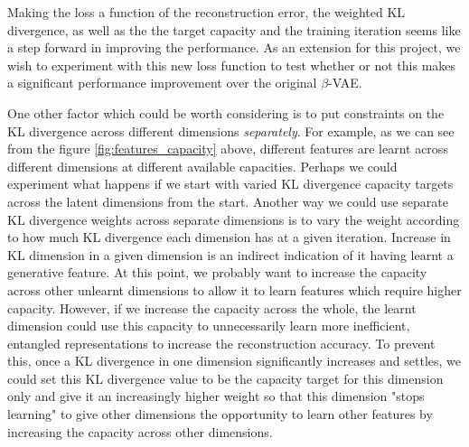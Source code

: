             Making the loss a function of the reconstruction error, the weighted KL divergence, as well as the the target capacity and the training iteration seems like a step forward in improving the performance. As an extension for this project, we wish to experiment with this new loss function to test whether or not this makes a significant performance improvement over the original $\beta$-VAE.
            
            One other factor which could be worth considering is to put constraints on the KL divergence across different dimensions \textit{separately}. For example, as we can see from the figure \ref{fig:features_capacity} above, different features are learnt across different dimensions at different available capacities. Perhaps we could experiment what happens if we start with varied KL divergence capacity targets across the latent dimensions from the start. Another way we could use separate KL divergence weights across separate dimensions is to vary the weight according to how much KL divergence each dimension has at a given iteration. Increase in KL dimension in a given dimension is an indirect indication of it having learnt a generative feature. At this point, we probably want to increase the capacity across other unlearnt dimensions to allow it to learn features which require higher capacity. However, if we increase the capacity across the whole, the learnt dimension could use this capacity to unnecessarily learn more inefficient, entangled representations to increase the reconstruction accuracy. To prevent this, once a KL divergence in one dimension significantly increases and settles, we could set this KL divergence value to be the capacity target for this dimension only and give it an increasingly higher weight so that this dimension "stops learning" to give other dimensions the opportunity to learn other features by increasing the capacity across other dimensions.